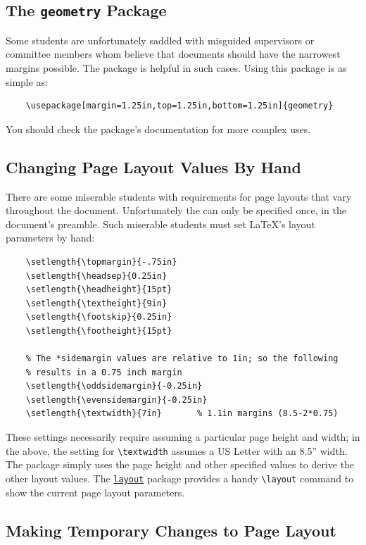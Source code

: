 \subsection{The \texttt{geometry} Package}

Some students are unfortunately saddled with misguided supervisors
or committee members whom believe that documents should have the
narrowest margins possible.  The  package is
helpful in such cases.  Using this package is as simple as:
\begin{lstlisting}
    \usepackage[margin=1.25in,top=1.25in,bottom=1.25in]{geometry}
\end{lstlisting}
You should check the package's documentation for more complex uses.

\subsection{Changing Page Layout Values By Hand}

There are some miserable students with requirements for page layouts
that vary throughout the document.  Unfortunately the
 can only be specified once, in the document's
preamble.  Such miserable students must set \LaTeX's layout parameters
by hand:
\begin{lstlisting}
    \setlength{\topmargin}{-.75in}
    \setlength{\headsep}{0.25in}
    \setlength{\headheight}{15pt}
    \setlength{\textheight}{9in}
    \setlength{\footskip}{0.25in}
    \setlength{\footheight}{15pt}

    % The *sidemargin values are relative to 1in; so the following
    % results in a 0.75 inch margin
    \setlength{\oddsidemargin}{-0.25in}
    \setlength{\evensidemargin}{-0.25in}
    \setlength{\textwidth}{7in}       % 1.1in margins (8.5-2*0.75)
\end{lstlisting}
These settings necessarily require assuming a particular page height
and width; in the above, the setting for \verb+\textwidth+ assumes
a \textsc{US} Letter with an 8.5'' width.
The  package simply uses the page height and
other specified values to derive the other layout values.
The
\href{http://tug.ctan.org/tex-archive/macros/latex/required/tools/layout.pdf}{\texttt{layout}}
package provides a
handy \verb+\layout+ command to show the current page layout
parameters. 


\subsection{Making Temporary Changes to Page Layout}

